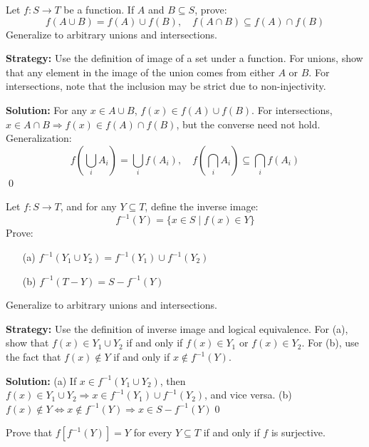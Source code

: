 \begin{problembox}
Let \( f: S \to T \) be a function. If \( A \) and \( B \subseteq S \), prove:
\[
f(A \cup B) = f(A) \cup f(B), \quad f(A \cap B) \subseteq f(A) \cap f(B)
\]
Generalize to arbitrary unions and intersections.
\end{problembox}

\noindent\textbf{Strategy:} Use the definition of image of a set under a function. For unions, show that any element in the image of the union comes from either $A$ or $B$. For intersections, note that the inclusion may be strict due to non-injectivity.

\noindent\bigskip\noindent\textbf{Solution:}  
For any \( x \in A \cup B \), \( f(x) \in f(A) \cup f(B) \).  
For intersections, \( x \in A \cap B \Rightarrow f(x) \in f(A) \cap f(B) \), but the converse need not hold.  
Generalization:  
\[
f\left( \bigcup_i A_i \right) = \bigcup_i f(A_i), \quad f\left( \bigcap_i A_i \right) \subseteq \bigcap_i f(A_i)
\]\qed



\begin{problembox}
Let \( f: S \to T \), and for any \( Y \subseteq T \), define the inverse image:
\[
f^{-1}(Y) = \{x \in S \mid f(x) \in Y \}
\]
Prove:
\begin{itemize}
\item[(a)] \( f^{-1}(Y_1 \cup Y_2) = f^{-1}(Y_1) \cup f^{-1}(Y_2) \)
\item[(b)] \( f^{-1}(T - Y) = S - f^{-1}(Y) \)
\end{itemize}
Generalize to arbitrary unions and intersections.
\end{problembox}

\noindent\textbf{Strategy:} Use the definition of inverse image and logical equivalence. For (a), show that $f(x) \in Y_1 \cup Y_2$ if and only if $f(x) \in Y_1$ or $f(x) \in Y_2$. For (b), use the fact that $f(x) \notin Y$ if and only if $x \notin f^{-1}(Y)$.

\noindent\bigskip\noindent\textbf{Solution:}  
(a) If \( x \in f^{-1}(Y_1 \cup Y_2) \), then \( f(x) \in Y_1 \cup Y_2 \Rightarrow x \in f^{-1}(Y_1) \cup f^{-1}(Y_2) \), and vice versa.  
(b) \( f(x) \notin Y \iff x \notin f^{-1}(Y) \Rightarrow x \in S - f^{-1}(Y) \)\qed



\begin{problembox}
Prove that \( f[f^{-1}(Y)] = Y \) for every \( Y \subseteq T \) if and only if \( f \) is surjective.
\end{problembox}

